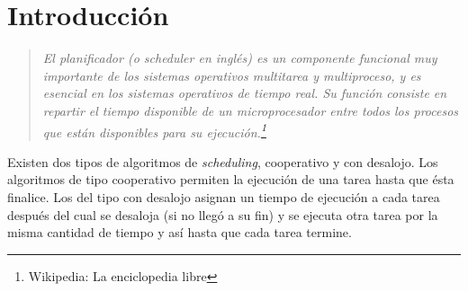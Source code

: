 \section{Introducción}

\begin{quote}

\textit{El planificador (o scheduler en inglés) es un componente funcional muy importante de los sistemas operativos multitarea y multiproceso, y es esencial en los sistemas operativos de tiempo real. Su función consiste en repartir el tiempo disponible de un microprocesador entre todos los procesos que están disponibles para su ejecución.\footnote{Wikipedia: La enciclopedia libre}}

\end{quote}

Existen dos tipos de algoritmos de \textit{scheduling}, cooperativo y con desalojo. Los algoritmos de tipo cooperativo permiten la ejecución de una tarea hasta que ésta finalice. Los del tipo con desalojo asignan un tiempo de ejecución a cada tarea después del cual se desaloja (si no llegó a su fin) y se ejecuta otra tarea por la misma cantidad de tiempo y así hasta que cada tarea termine. 



